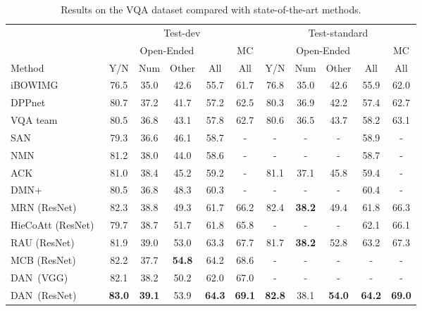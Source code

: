 \documentclass[10pt,twocolumn,letterpaper]{article}
\begin{document}
\begin{table*}[t]
\caption{
Results on the VQA dataset compared with state-of-the-art methods.
}
\vspace{-2mm}
  \centering
  \begin{tabular}{lcccccccccc}
    \toprule
	& \multicolumn{5}{c}{Test-dev}
	& \multicolumn{5}{c}{Test-standard} \\
    \cmidrule(lr){2-6} \cmidrule(lr){7-11}
	& \multicolumn{4}{c}{Open-Ended}
	& {MC} 
	& \multicolumn{4}{c}{Open-Ended}
	& {MC} \\
    \cmidrule(lr){2-5} \cmidrule(lr){6-6} \cmidrule(lr){7-10} \cmidrule(lr){11-11}
	{Method}
	& {Y/N} & {Num} & {Other} & {All} & {All}
	& {Y/N} & {Num} & {Other} & {All} & {All} \\
    \midrule
	{iBOWIMG~\cite{zhou2015simple}}
	& {76.5} & {35.0} & {42.6} & {55.7} & {61.7}
	& {76.8} & {35.0} & {42.6} & {55.9} & {62.0} \\
	{DPPnet~\cite{noh2016image}}
	& {80.7} & {37.2} & {41.7} & {57.2} & {62.5}
	& {80.3} & {36.9} & {42.2} & {57.4} & {62.7} \\
	{VQA team~\cite{antol2015vqa}}
	& {80.5} & {36.8} & {43.1} & {57.8} & {62.7}
	& {80.6} & {36.5} & {43.7} & {58.2} & {63.1} \\
	{SAN~\cite{yang2016stacked}}
	& {79.3} & {36.6} & {46.1} & {58.7} & {-}
	& {-} & {-} & {-} & {58.9} & {-} \\
	{NMN~\cite{andreas2016neural}}
	& {81.2} & {38.0} & {44.0} & {58.6} & {-}
	& {-} & {-} & {-} & {58.7} & {-} \\
	{ACK~\cite{wu2016ask}}
	& {81.0} & {38.4} & {45.2} & {59.2} & {-}
	& {81.1} & {37.1} & {45.8} & {59.4} & {-} \\
{DMN+~\cite{xiong2016dynamic}}
	& {80.5} & {36.8} & {48.3} & {60.3} & {-}
	& {-} & {-} & {-} & {60.4} & {-} \\
	{MRN (ResNet)~\cite{kim2016multimodal}}
	& {82.3} & {38.8} & {49.3} & {61.7} & {66.2}
	& {82.4} & {\bf{38.2}} & {49.4} & {61.8} & {66.3} \\
	{HieCoAtt (ResNet)~\cite{lu2016hierarchical}}
	& {79.7} & {38.7} & {51.7} & {61.8} & {65.8}
	& {-} & {-} & {-} & {62.1} & {66.1} \\
	{RAU (ResNet)~\cite{noh2016training}}
	& {81.9} & {39.0} & {53.0} & {63.3} & {67.7}
	& {81.7} & {\bf{38.2}} & {52.8} & {63.2} & {67.3} \\
	{MCB (ResNet)~\cite{fukui2016multimodal}}
	& {82.2} & {37.7} & {\bf{54.8}} & {64.2} & {68.6}
	& {-} & {-} & {-} & {-} & {-} \\
	\midrule
	{DAN\ (VGG)}
	& {82.1} & {38.2} & {50.2} & {62.0} & {67.0}
	& {-} & {-} & {-} & {-} & {-} \\
	{DAN\ (ResNet)}
	& {\bf{83.0}} & {\bf{39.1}} & {53.9} & {\bf{64.3}} & {\bf{69.1}}
	& {\bf{82.8}} & {38.1} & {\bf{54.0}} & {\bf{64.2}} & {\bf{69.0}} \\
\hline
  \end{tabular}
\label{tab:vqa}
\end{table*}
\end{document}

